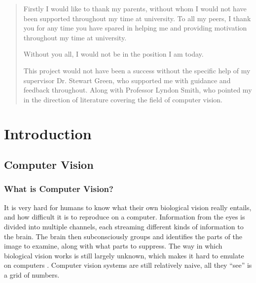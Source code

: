 \documentclass[11pt,oneside]{report}
\begin{document}
	
	\begin{abstract}
	
	\end{abstract}	
	
	\renewcommand{\abstractname}{Acknowledgements}
	\begin{abstract}
	\begin{center}
	Firstly I would like to thank my parents, without whom I would not have been supported throughout my time at university.
	To all my peers, I thank you for any time you have spared in helping me and providing motivation throughout my time at university.
	
	Without you all, I would not be in the position I am today.
	
	This project would not have been a success without the specific help of my supervisor Dr. Stewart Green, who supported me with guidance and feedback throughout.
	Along with Professor Lyndon Smith, who pointed my in the direction of literature covering the field of computer vision.
	\end{center}
	\end{abstract}
	
	\tableofcontents
	\listoffigures
	\listoftables
	\renewcommand{\lstlistlistingname}{List of Listings}
	\lstlistoflistings


	\chapter{Introduction}\label{chap:introduction}
		
		\section{Computer Vision}
			\subsection{What is Computer Vision?}		
				
				It is very hard for humans to know what their own biological vision really entails, and how difficult it is to reproduce on a computer.
				Information from the eyes is divided into multiple channels, each streaming different kinds of information to the brain.
				The brain then subconsciously groups and identifies the parts of the image to examine, along with what parts to suppress.
				The way in which biological vision works is still largely unknown, which makes it hard to emulate on computers \cite[p. xi]{book:multiViewGeo}.				
				Computer vision systems are still relatively naive, all they ``see'' is a grid of numbers.%
				
\end{document}

